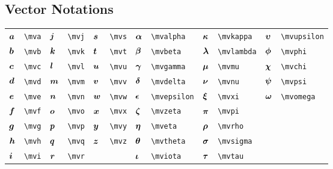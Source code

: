 \documentclass{article}
\begin{document}
\subsection{Vector Notations}
\begin{tabular}{*{12}{l}}
${\bm a}$ & \lstinline`\mva` & ${\bm j}$ & \lstinline`\mvj` & ${\bm s}$ & \lstinline`\mvs` & ${\bm \alpha}$ & \lstinline`\mvalpha` & ${\bm \kappa}$ & \lstinline`\mvkappa` & ${\bm \upsilon}$ & \lstinline`\mvupsilon`\\
${\bm b}$ & \lstinline`\mvb` & ${\bm k}$ & \lstinline`\mvk` & ${\bm t}$ & \lstinline`\mvt` & ${\bm \beta}$ & \lstinline`\mvbeta` & ${\bm \lambda}$ & \lstinline`\mvlambda` & ${\bm \phi}$ & \lstinline`\mvphi`\\
${\bm c}$ & \lstinline`\mvc` & ${\bm l}$ & \lstinline`\mvl` & ${\bm u}$ & \lstinline`\mvu` & ${\bm \gamma}$ & \lstinline`\mvgamma` & ${\bm \mu}$ & \lstinline`\mvmu` & ${\bm \chi}$ & \lstinline`\mvchi`\\
${\bm d}$ & \lstinline`\mvd` & ${\bm m}$ & \lstinline`\mvm` & ${\bm v}$ & \lstinline`\mvv` & ${\bm \delta}$ & \lstinline`\mvdelta` & ${\bm \nu}$ & \lstinline`\mvnu` & ${\bm \psi}$ & \lstinline`\mvpsi`\\
${\bm e}$ & \lstinline`\mve` & ${\bm n}$ & \lstinline`\mvn` & ${\bm w}$ & \lstinline`\mvw` & ${\bm \epsilon}$ & \lstinline`\mvepsilon` & ${\bm \xi}$ & \lstinline`\mvxi` & ${\bm \omega}$ & \lstinline`\mvomega`\\
${\bm f}$ & \lstinline`\mvf` & ${\bm o}$ & \lstinline`\mvo` & ${\bm x}$ & \lstinline`\mvx` & ${\bm \zeta}$ & \lstinline`\mvzeta` & ${\bm \pi}$ & \lstinline`\mvpi` & \\
${\bm g}$ & \lstinline`\mvg` & ${\bm p}$ & \lstinline`\mvp` & ${\bm y}$ & \lstinline`\mvy` & ${\bm \eta}$ & \lstinline`\mveta` & ${\bm \rho}$ & \lstinline`\mvrho` & \\
${\bm h}$ & \lstinline`\mvh` & ${\bm q}$ & \lstinline`\mvq` & ${\bm z}$ & \lstinline`\mvz` & ${\bm \theta}$ & \lstinline`\mvtheta` & ${\bm \sigma}$ & \lstinline`\mvsigma` & \\
${\bm i}$ & \lstinline`\mvi` & ${\bm r}$ & \lstinline`\mvr` &  &  & ${\bm \iota}$ & \lstinline`\mviota` & ${\bm \tau}$ & \lstinline`\mvtau` & \\
\end{tabular}
\end{document}
